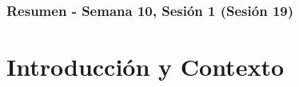 \documentclass[10pt]{beamer}
\begin{document}
\myfront{}

\begin{frame}
  \titlepage
\end{frame}

\begin{frame}
  \frametitle{Resumen - Semana 10, Sesión 1 (Sesión 19)}
  \tableofcontents
\end{frame}


\section{Introducción y Contexto}
\end{document}
